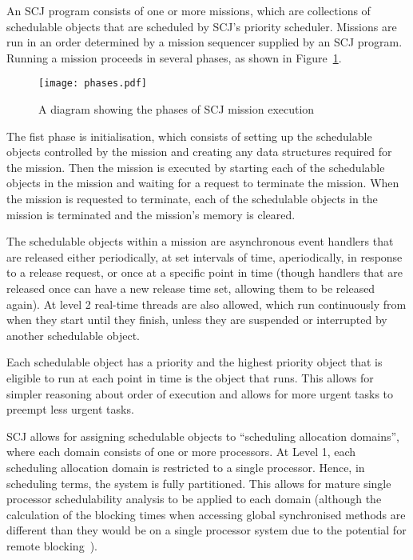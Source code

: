 \documentclass[a4paper,10pt]{report}
\begin{document}
An SCJ program consists of one or more missions, which are collections
of schedulable objects that are scheduled by SCJ's priority scheduler.
Missions are run in an order determined by a mission sequencer
supplied by an SCJ program.
Running a mission proceeds in several phases, as shown in
Figure~\ref{phases-diagram}.

\begin{figure}[ht]
  \texttt{[image: phases.pdf]}
  \caption{A diagram showing the phases of SCJ mission execution}
  \label{phases-diagram}
\end{figure}

The fist phase is initialisation, which consists of setting up the
schedulable objects controlled by the mission and creating any data
structures required for the mission.
Then the mission is executed by starting each of the schedulable
objects in the mission and waiting for a request to terminate the
mission.
When the mission is requested to terminate, each of the schedulable
objects in the mission is terminated and the mission's memory is
cleared.

The schedulable objects within a mission are asynchronous event
handlers that are released either periodically, at set intervals of
time, aperiodically, in response to a release request, or once at a
specific point in time (though handlers that are released once can
have a new release time set, allowing them to be released again).
At level 2 real-time threads are also allowed, which run continuously
from when they start until they finish, unless they are suspended or
interrupted by another schedulable object.

Each schedulable object has a priority and the highest priority object
that is eligible to run at each point in time is the object that runs.
This allows for simpler reasoning about order of execution and allows
for more urgent tasks to preempt less urgent tasks.

SCJ allows for assigning schedulable objects to ``scheduling
allocation domains'', where each domain consists of one or more
processors.
At Level 1, each scheduling allocation domain is restricted to a
single processor.
Hence, in scheduling terms, the system is fully partitioned.
This allows for mature single processor schedulability analysis to be
applied to each domain (although the calculation of the blocking times
when accessing global synchronised methods are different than they
would be on a single processor system due to the potential for remote
blocking~\cite{davis2011}).
\end{document}
